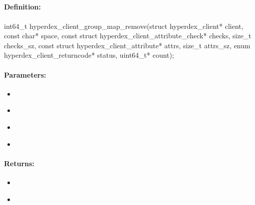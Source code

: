\pagebreak
\subsection{}
\label{api:c:group_map_remove}


\paragraph{Definition:}
\begin{ccode}
int64_t hyperdex_client_group_map_remove(struct hyperdex_client* client,
        const char* space,
        const struct hyperdex_client_attribute_check* checks, size_t checks_sz,
        const struct hyperdex_client_attribute* attrs, size_t attrs_sz,
        enum hyperdex_client_returncode* status,
        uint64_t* count);
\end{ccode}

\paragraph{Parameters:}
\begin{itemize}[noitemsep]
\item {}\\

\item {}\\

\item {}\\

\item {}\\

\end{itemize}

\paragraph{Returns:}
\begin{itemize}[noitemsep]
\item {}\\

\item {}\\

\end{itemize}

